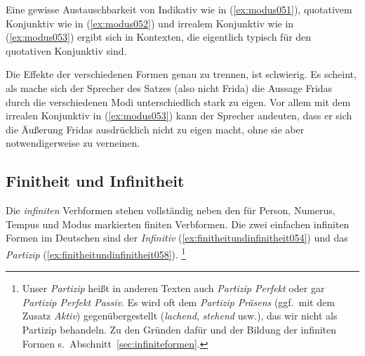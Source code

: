
Eine gewisse Austauschbarkeit von Indikativ wie in (\ref{ex:modus051}), quotativem Konjunktiv wie in (\ref{ex:modus052}) und irrealem Konjunktiv wie in (\ref{ex:modus053}) ergibt sich in Kontexten, die eigentlich typisch für den quotativen Konjunktiv sind.

\begin{exe}
  \ex\label{ex:modus050}
  \begin{xlist}
  \end{xlist}
\end{exe}

Die Effekte der verschiedenen Formen genau zu trennen, ist schwierig.
Es scheint, als mache sich der Sprecher des Satzes (also nicht Frida) die Aussage Fridas durch die verschiedenen Modi unterschiedlich stark zu eigen.
Vor allem mit dem irrealen Konjunktiv in (\ref{ex:modus053}) kann der Sprecher andeuten, dass er sich die Äußerung Fridas ausdrücklich nicht zu eigen macht, ohne sie aber notwendigerweise zu verneinen.

\subsection{Finitheit und Infinitheit}
\label{sec:finitheitundinfinitheit}


Die \textit{infiniten} Verbformen stehen vollständig neben den für Person, Numerus, Tempus und Modus markierten finiten Verbformen.
Die zwei einfachen infiniten Formen im Deutschen sind der \textit{Infinitiv} (\ref{ex:finitheitundinfinitheit054}) und das \textit{Partizip} (\ref{ex:finitheitundinfinitheit058}).%
\footnote{Unser \textit{Partizip} heißt in anderen Texten auch \textit{Partizip Perfekt} oder gar \textit{Partizip Perfekt Passiv}.
Es wird oft dem \textit{Partizip Präsens} (ggf.\ mit dem Zusatz \textit{Aktiv}) gegenübergestellt (\textit{lachend}, \textit{stehend} usw.), das wir nicht als Partizip behandeln.
Zu den Gründen dafür und der Bildung der infiniten Formen s.\ Abschnitt~\ref{sec:infiniteformen}.}

